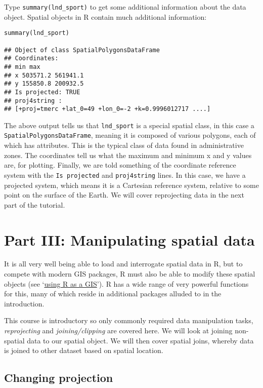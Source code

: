 \documentclass[]{article}
\begin{document}
Type \texttt{summary(lnd\_sport)} to get some additional information
about the data object. Spatial objects in R contain much additional
information:

\begin{verbatim}
summary(lnd_sport)

## Object of class SpatialPolygonsDataFrame
## Coordinates:
## min max
## x 503571.2 561941.1
## y 155850.8 200932.5
## Is projected: TRUE
## proj4string :
## [+proj=tmerc +lat_0=49 +lon_0=-2 +k=0.9996012717 ....]
\end{verbatim}

The above output tells us that \texttt{lnd\_sport} is a special spatial
class, in this case a \texttt{SpatialPolygonsDataFrame}, meaning it is
composed of various polygons, each of which has attributes. This is the
typical class of data found in administrative zones. The coordinates
tell us what the maximum and minimum x and y values are, for plotting.
Finally, we are told something of the coordinate reference system with
the \texttt{Is projected} and \texttt{proj4string} lines. In this case,
we have a projected system, which means it is a Cartesian reference
system, relative to some point on the surface of the Earth. We will
cover reprojecting data in the next part of the tutorial.

\section{Part III: Manipulating spatial
data}\label{part-iii-manipulating-spatial-data}

It is all very well being able to load and interrogate spatial data in
R, but to compete with modern GIS packages, R must also be able to
modify these spatial objects (see
`\href{https://github.com/Pakillo/R-GIS-tutorial}{using R as a GIS}'). R
has a wide range of very powerful functions for this, many of which
reside in additional packages alluded to in the introduction.

This course is introductory so only commonly required data manipulation
tasks, \emph{reprojecting} and \emph{joining/clipping} are covered here.
We will look at joining non-spatial data to our spatial object. We will
then cover spatial joins, whereby data is joined to other dataset based
on spatial location.

\subsection{Changing projection}\label{changing-projection}
\end{document}

